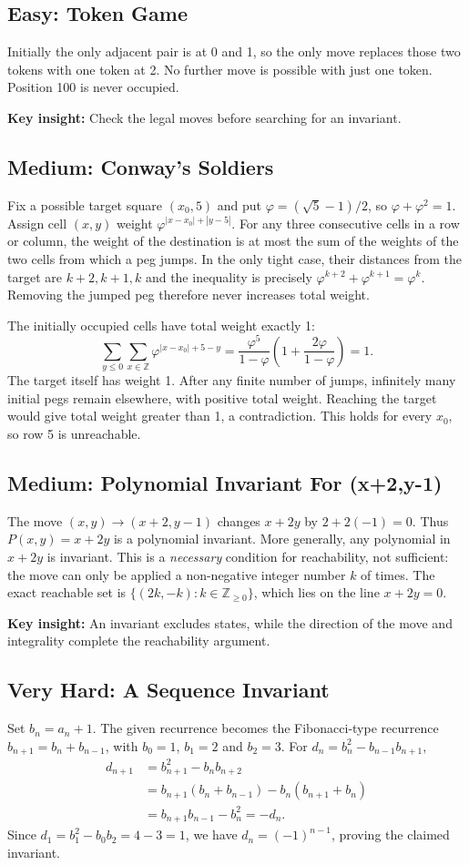 \documentclass[12pt]{article}
\newcommand{\insight}[1]{\par\medskip\noindent\textbf{Key insight:} #1}
\begin{document}
\subsection*{Easy: Token Game}
Initially the only adjacent pair is at 0 and 1, so the only move
replaces those two tokens with one token at 2. No further move is
possible with just one token. Position 100 is never occupied.
\insight{Check the legal moves before searching for an invariant.}

\subsection*{Medium: Conway's Soldiers}
Fix a possible target square $(x_0,5)$ and put
$\varphi=(\sqrt5-1)/2$, so $\varphi+\varphi^2=1$.
Assign cell $(x,y)$ weight $\varphi^{|x-x_0|+|y-5|}$.
For any three consecutive cells in a row or column, the weight of
the destination is at most the sum of the weights of the two cells
from which a peg jumps. In the only tight case, their distances from
the target are $k+2,k+1,k$ and the inequality is precisely
$\varphi^{k+2}+\varphi^{k+1}=\varphi^k$.
Removing the jumped peg therefore never increases total weight.

The initially occupied cells have total weight exactly 1:
\[
\sum_{y\le0}\sum_{x\in\mathbb Z}
\varphi^{|x-x_0|+5-y}
=\frac{\varphi^5}{1-\varphi}
 \left(1+\frac{2\varphi}{1-\varphi}\right)=1.
\]
The target itself has weight 1. After any finite number of jumps,
infinitely many initial pegs remain elsewhere, with positive total
weight. Reaching the target would give total weight greater than 1,
a contradiction. This holds for every $x_0$, so row 5 is unreachable.

\subsection*{Medium: Polynomial Invariant For (x+2,y-1)}
The move $(x,y)\to(x+2,y-1)$ changes $x+2y$ by $2+2(-1)=0$. Thus
$P(x,y)=x+2y$ is a polynomial invariant. More generally, any
polynomial in $x+2y$ is invariant. This is a \emph{necessary} condition
for reachability, not sufficient: the move can only be applied a
non-negative integer number $k$ of times. The exact reachable set
is $\{(2k,-k):k\in\mathbb Z_{\ge0}\}$, which lies on the line
$x+2y=0$.
\insight{An invariant excludes states, while the direction of the move
and integrality complete the reachability argument.}

\subsection*{Very Hard: A Sequence Invariant}
Set $b_n=a_n+1$. The given recurrence becomes the Fibonacci-type
recurrence $b_{n+1}=b_n+b_{n-1}$, with $b_0=1$, $b_1=2$ and $b_2=3$.
For $d_n=b_n^2-b_{n-1}b_{n+1}$,
\[
\begin{aligned}
d_{n+1}&=b_{n+1}^2-b_nb_{n+2}\\
&=b_{n+1}(b_n+b_{n-1})-b_n(b_{n+1}+b_n)\\
&=b_{n+1}b_{n-1}-b_n^2=-d_n.
\end{aligned}
\]
Since $d_1=b_1^2-b_0b_2=4-3=1$, we have
$d_n=(-1)^{n-1}$, proving the claimed invariant.
\end{document}
